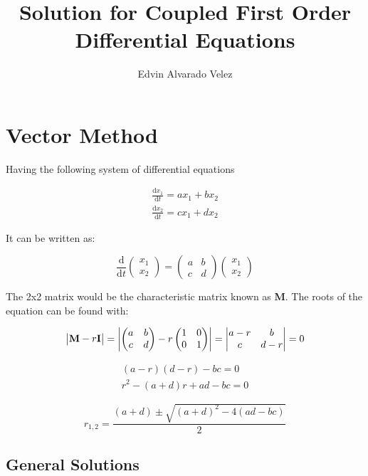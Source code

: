 \documentclass[12pt,letterpaper]{article}
\author{Edvin Alvarado Velez}
\title{Solution for Coupled First Order Differential Equations}
\newcommand{\vectors}[2]{
	\begin{pmatrix}
		#1 \\ #2
	\end{pmatrix}
}
\newcommand{\smatrix}[4]{
	\begin{pmatrix}
		#1 & #2 \\ #3 & #4
	\end{pmatrix}
}
\newcommand{\dmatrix}[4]{
	\begin{vmatrix}
		#1 & #2 \\ #3 & #4
	\end{vmatrix}
}
\begin{document}
	\maketitle
	
	\clearpage
		

	\section{Vector Method}

		Having the following system of differential equations

		\begin{align*}
			\frac{\mathrm{d}x_1}{\mathrm{d}t} = a x_1 + b x_2 \\
			\frac{\mathrm{d}x_2}{\mathrm{d}t} = c x_1 + d x_2 
		\end{align*}

		It can be written as:

		\begin{equation}
			\frac{\mathrm{d}}{\mathrm{d}t} \vectors{x_1}{x_2} = \smatrix{a}{b}{c}{d} \vectors{x_1}{x_2}
		\end{equation}
		\label{og}

		The 2x2 matrix would be the characteristic matrix known as \textbf{M}. The roots of the equation can be found with:

		\begin{equation}
			\begin{vmatrix}	\text{\textbf{M}}-r \text{\textbf{I}} \end{vmatrix} = \left| \smatrix{a}{b}{c}{d} - r \smatrix{1}{0}{0}{1} \right| = \dmatrix{a-r}{b}{c}{d-r} = 0
		\end{equation}
		\label{characteristic matrix}

		\begin{align*}
			(a-r)(d-r) - bc = 0 \\
			r^2 -(a+d)r + ad -bc = 0 
		\end{align*}

		\begin{equation}
			r_{1,2} = \frac{(a+d) \pm \sqrt{(a+d)^2-4(ad-bc)}}{2}
		\end{equation}
		\label{roots}

		\subsection{General Solutions}
\end{document}

